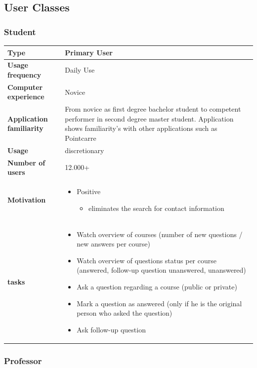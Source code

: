 \documentclass[10pt]{report}
\begin{document}
\subsection{User Classes}

\subsubsection{Student}

\begin{tabular}{ | l | p{10cm} |}
\hline
\textbf{Type} & Primary User \\ \hline
\textbf{Usage frequency} & Daily Use \\ \hline
\textbf{Computer experience} & Novice \\ \hline
\textbf{Application familiarity} & From novice as first degree bachelor student to competent performer in second degree master student. Application shows familiarity's with other applications such as Pointcarre\\ \hline
\textbf{Usage} & discretionary\\ \hline
\textbf{Number of users} & 12.000+\\ \hline
\textbf{Motivation} & 
	\begin{itemize}
		\item Positive 
		\begin{itemize}
			\item eliminates the search for contact information
		\end{itemize}
	\end{itemize} \\ \hline
\textbf{tasks} & 
	\begin{itemize}
		\item Watch overview of courses (number of new questions / new answers per course)
		\item Watch overview of questions status per course (answered, follow-up question unanswered, unanswered)
		\item Ask a question regarding a course (public or private)
		\item Mark a question as answered (only if he is the original person who asked the question)
		\item Ask follow-up question
	\end{itemize} \\ \hline
\end{tabular}

\subsubsection{Professor}
\end{document}
